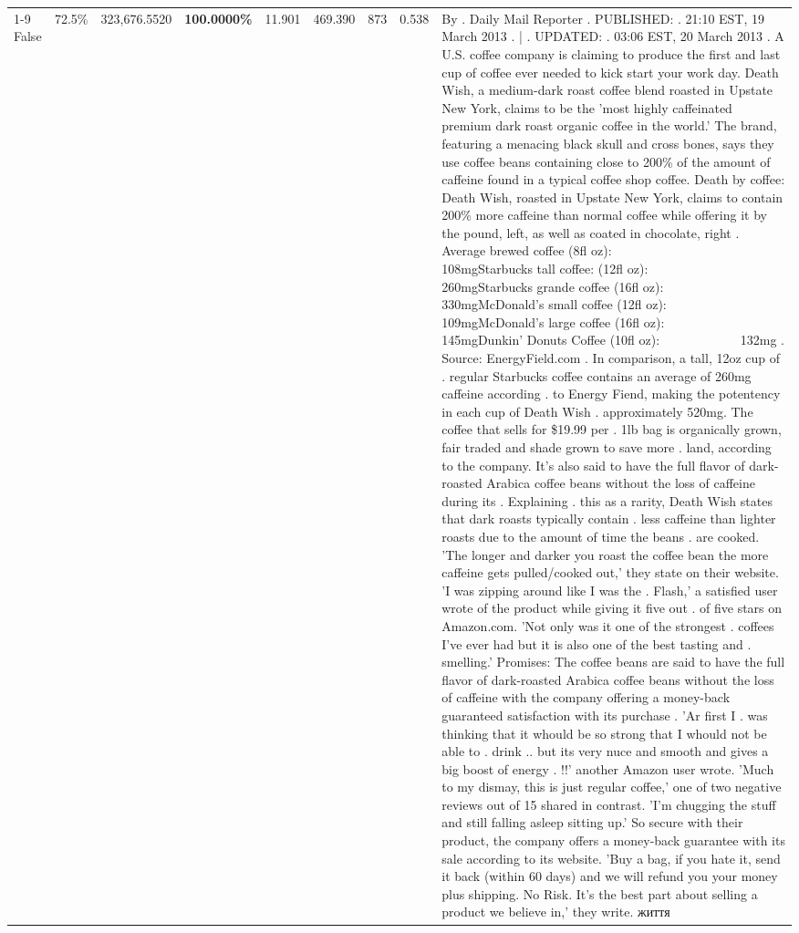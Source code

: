 \begin{table}[H]
{\begin{tabular}{lllrlllll}
\cline{1-9}
False & 72.5\% & 323,676.5520 & \bfseries \color{red} 100.0000\% & 11.901 & 469.390 & 873 & 0.538 & By . Daily Mail Reporter . PUBLISHED: . 21:10 EST, 19 March 2013 . | . UPDATED: . 03:06 EST, 20 March 2013 . A U.S. coffee company is claiming to produce the first and last cup of coffee ever needed to kick start your work day. Death Wish, a medium-dark roast coffee blend roasted in Upstate New York, claims to be the 'most highly caffeinated premium dark roast organic coffee in the world.' The brand, featuring a menacing black skull and cross bones, says they use coffee beans containing close to 200\% of the amount of caffeine found in a typical coffee shop coffee. Death by coffee: Death Wish, roasted in Upstate New York, claims to contain 200\% more caffeine than normal coffee while offering it by the pound, left, as well as coated in chocolate, right . Average brewed coffee (8fl oz):              108mgStarbucks tall coffee: (12fl oz):                260mgStarbucks grande coffee (16fl oz):         330mgMcDonald's small coffee (12fl oz):           109mgMcDonald's large coffee (16fl oz):           145mgDunkin' Donuts Coffee (10fl oz):             132mg . Source: EnergyField.com . In comparison, a tall, 12oz cup of . regular Starbucks coffee contains an average of 260mg caffeine according . to Energy Fiend, making the potentency in each cup of Death Wish . approximately 520mg. The coffee that sells for \$19.99 per . 1lb bag is organically grown, fair traded and shade grown to save more . land, according to the company. It's also said to have the full flavor of dark-roasted Arabica coffee beans without the loss of caffeine during its . Explaining . this as a rarity, Death Wish states that dark roasts typically contain . less caffeine than lighter roasts due to the amount of time the beans . are cooked. 'The longer and darker you roast the coffee bean the more caffeine gets pulled/cooked out,' they state on their website. 'I was zipping around like I was the . Flash,' a satisfied user wrote of the product while giving it five out . of five stars on Amazon.com. 'Not only was it one of the strongest . coffees I've ever had but it is also one of the best tasting and . smelling.’ Promises: The coffee beans are said to have the full flavor of dark-roasted Arabica coffee beans without the loss of caffeine with the company offering a money-back guaranteed satisfaction with its purchase . 'Ar first I . was thinking that it whould be so strong that I whould not be able to . drink .. but its very nuce and smooth and gives a big boost of energy . !!' another Amazon user wrote. 'Much to my dismay, this is just regular coffee,' one of two negative reviews out of 15 shared in contrast. 'I'm chugging the stuff and still falling asleep sitting up.' So secure with their product, the company offers a money-back guarantee with its sale according to its website. 'Buy a bag, if you hate it, send it back (within 60 days) and we will refund you your money plus shipping. No Risk. It’s the best part about selling a product we believe in,' they write. життя \\

\end{tabular}}
\end{table}
